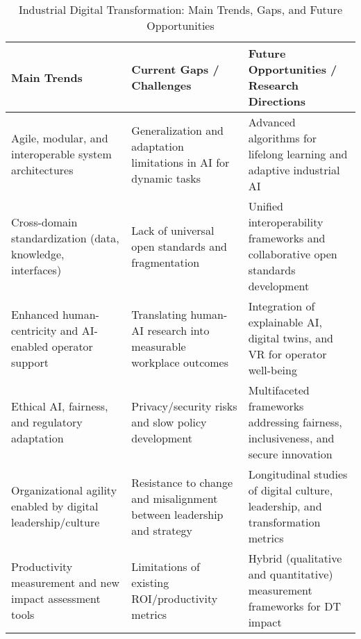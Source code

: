 \documentclass[sigconf]{acmart}
\begin{document}
\begin{table*}[htbp]
\centering
\caption{Industrial Digital Transformation: Main Trends, Gaps, and Future Opportunities}
\label{tab:trends_gaps_opportunities}
\begin{adjustbox}{max width=\textwidth}
\begin{tabular}{@{}lll@{}}
\toprule
\textbf{Main Trends} & \textbf{Current Gaps / Challenges} & \textbf{Future Opportunities / Research Directions} \\
\midrule
Agile, modular, and interoperable system architectures~\cite{ref3}\cite{ref68} & Generalization and adaptation limitations in AI for dynamic tasks~\cite{ref19}\cite{ref20}\cite{ref54} & Advanced algorithms for lifelong learning and adaptive industrial AI \\
Cross-domain standardization (data, knowledge, interfaces)~\cite{ref13}\cite{ref86} & Lack of universal open standards and fragmentation~\cite{ref13}\cite{ref86} & Unified interoperability frameworks and collaborative open standards development \\
Enhanced human-centricity and AI-enabled operator support~\cite{ref45}\cite{ref83}\cite{ref90} & Translating human-AI research into measurable workplace outcomes & Integration of explainable AI, digital twins, and VR for operator well-being \\
Ethical AI, fairness, and regulatory adaptation~\cite{ref35}\cite{ref41}\cite{ref90} & Privacy/security risks and slow policy development~\cite{ref35}\cite{ref41} & Multifaceted frameworks addressing fairness, inclusiveness, and secure innovation \\
Organizational agility enabled by digital leadership/culture~\cite{ref93} & Resistance to change and misalignment between leadership and strategy~\cite{ref93} & Longitudinal studies of digital culture, leadership, and transformation metrics \\
Productivity measurement and new impact assessment tools~\cite{ref86}\cite{ref94} & Limitations of existing ROI/productivity metrics & Hybrid (qualitative and quantitative) measurement frameworks for DT impact \\
\bottomrule
\end{tabular}
\end{adjustbox}
\end{table*}
\end{document}
